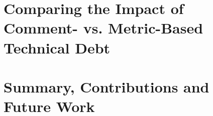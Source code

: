\documentclass[12pt]{report}
\begin{document}
\chapter{Comparing the Impact of Comment- vs. Metric-Based Technical Debt}
\label{chapter4}


\chapter{Summary, Contributions and Future Work}
\label{conclusion}



\begin{appendices}
	\label{appendix}
	
\end{appendices}

  

\end{document}
